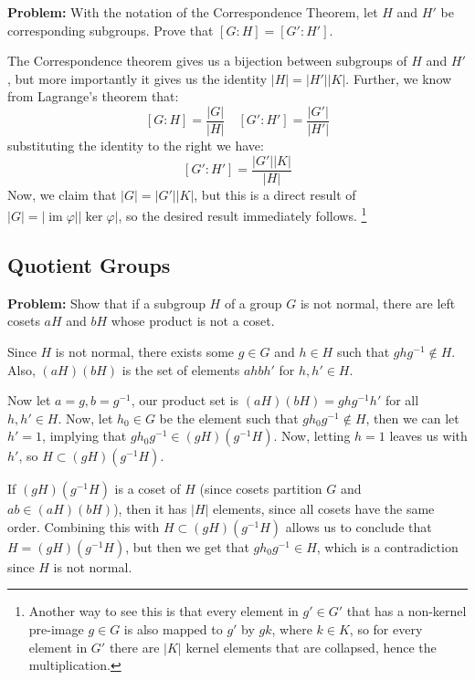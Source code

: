 \documentclass[10pt]{article}
\newenvironment{problem}{\textbf{Problem:}}{}
\DeclareMathOperator{\im}{im}
\begin{document}
\begin{problem}
	With the notation of the Correspondence Theorem, let \( H \) and \( H' \) be 
	corresponding subgroups. Prove that \( [G : H] = [G':H'] \). 
\end{problem}

\begin{solution}
	The Correspondence theorem gives us a bijection between subgroups of \( H \) and 
	\( H' \), but more importantly it gives us the identity \( |H| = |H'| |K| \). 
	Further, we know from Lagrange's theorem that:
	\[
		[G : H] = \frac{|G|}{|H|} \quad [G' : H'] = \frac{|G'|}{|H'|}
	\] 
	substituting the identity to the right we have:
	\[
		[G' : H'] = \frac{|G'| |K|}{|H|}
	\] 
	Now, we claim that \( |G| = |G'| |K| \), but this is a direct result 
	of \( |G| = |\im \varphi| |\ker \varphi| \), so the desired result 
	immediately follows.
	\footnote{Another way to see this is that every element in \(g' \in  G' \) that has 
		a non-kernel pre-image \( g \in G \) is also mapped to \( g' \) by 
		\( gk \), where \( k \in K \), so for every element in \( G' \) there are 
	\( |K| \) kernel elements that are collapsed, hence the multiplication.}
\end{solution}

\addtocounter{subsection}{1}
\subsection{Quotient Groups}
\begin{problem}
	Show that if a subgroup \( H \) of a group \( G \) is not normal, there are 
	left cosets \( aH \) and \( bH \) whose product is not a coset. 
\end{problem}

\begin{solution}
	Since \( H \) is not normal, there exists some  \( g \in G \) and \( h \in H \) 
	such that \( ghg^{-1} \not \in H \). Also, \( (aH)(bH) \) is the set 
	of elements \( ahbh'\) for \( h, h' \in H \). 

	Now let \( a = g, b = g^{-1} \), our product set is \( (aH)(bH) = 
	ghg^{-1} h'\) for all \( h, h' \in H \). Now, let \( h_0 \in G \) be the element 
	such that \( gh_0g^{-1} \not \in H \), then we can let \( h' = 1 \), 
	implying that \( gh_0g^{-1} \in (gH)(g^{-1} H) \). Now, letting \( h = 1 \)
	leaves us with \( h'\), so \( H \subset (gH)(g^{-1}H) \).

	If \( (gH)(g^{-1} H) \) is a coset of \( H \) (since cosets partition \( G \) 
	and \( ab \in (aH)(bH) \)), then it has \( |H| \) elements, 
	since all cosets have the same order. Combining this with 
	\( H \subset (gH)(g^{-1} H) \) allows us to conclude that 
	\( H = (gH)(g^{-1} H) \), but then we get that 
	\( gh_0g^{-1} \in H \), which is a contradiction since \( H \) is not normal.  
\end{solution}
\end{document}
